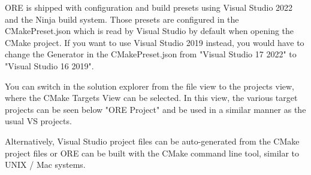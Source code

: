 \documentclass[12pt, a4paper]{article}
\begin{document}
ORE is shipped with configuration and build presets using Visual Studio 2022 and the Ninja build system. Those presets are configured in the CMakePreset.json which is read by Visual Studio by default when opening the CMake project. If you want to use Visual Studio 2019 instead, you would have to change the Generator in the CMakePreset.json from "Visual Studio 17 2022" to "Visual Studio 16 2019".

You can switch in the solution explorer from the file view to the projects view, where the CMake Targets View can be selected. In this view, the various target projects can be seen below "ORE Project" and be used in a similar manner as the usual VS projects.

\medskip

Alternatively, Visual Studio project files can be auto-generated from the CMake project files or ORE can be built with the CMake command line tool, similar to UNIX / Mac systems.
\end{document}
